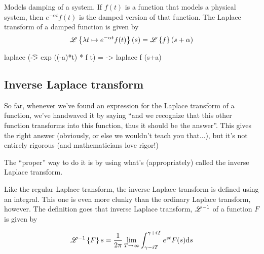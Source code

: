 Models damping of a system. If $f(t)$ is a function that models a physical system, then $e^{-\alpha t}f(t)$ is the damped version of that function. The Laplace transform of a damped function is given by
\begin{equation*}
    \mathscr{L} \left\{\lambda t \mapsto e^{-\alpha t} f(t)\right\}(s) = \mathscr{L}\left\{f\right\}(s+\alpha)
\end{equation*}
 
\begin{codeeq}
laplace (\t -> exp ((-a)*t) * f t) = \s -> laplace f (s+a)
\end{codeeq}


\subsection{Inverse Laplace transform}  

So far, whenever we've found an expression for the Laplace transform of a function, we've handwaved it by saying ``and we recognize that this other function transforms into this function, thus it should be the answer''. This gives the right answer (obviously, or else we wouldn't teach you that...), but it's not entirely rigorous (and mathematicians love rigor!)

The ``proper'' way to do it is by using what's (appropriately) called the inverse Laplace transform.

Like the regular Laplace transform, the inverse Laplace transform is defined using an integral. This one is even more clunky than the ordinary Laplace transform, however. The definition goes that inverse Laplace transform, $\mathscr{L}^{-1}$ of a function $F$ is given by

\begin{equation*}
    \mathscr{L}^{-1} \left\{F\right\} s = \frac{1}{2\pi} \lim_{T\to\infty} \int_{\gamma - iT}^{\gamma + iT} e^{st} F(s) \dd s 
\end{equation*}





\iffalse
If we define 
\begin{code}
type TimeDomain      = Real
type FrequencyDomain = Complex
\end{code}
then we can define the type of the Laplace transform accordingly: 
\begin{code} 
laplace :: TimeDomain -> FrequencyDomain 
\end{code}







\todo[inline,color=other]{introduce what a laplace transform is in words.
show how we construct it in a dsl. (show code)
some examples (just showing that the code works)
some examples from the book. as many different ones as possible, if some examples doesn't work with our code explain why.
}
\fi